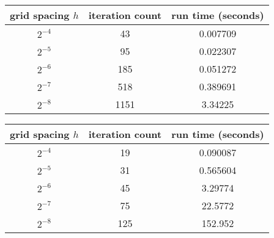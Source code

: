 \documentclass[12pt]{article}
\begin{document}
\begin{center}
\begin{tabular}{||c|c|c||}
\hline \hline
   grid spacing $h$ &   iteration count &   run time (seconds) \\
\hline
       $2^{-4}$     &                43 &             0.007709 \\
       $2^{-5}$    &                95 &             0.022307 \\
       $2^{-6}$   &               185 &             0.051272 \\
       $2^{-7}$  &               518 &             0.389691 \\
       $2^{-8}$ &              1151 &             3.34225  \\
\hline
\end{tabular}
\end{center}
\newpage
\begin{center}
\begin{tabular}{||c|c|c||}
\hline \hline
   grid spacing $h$ &   iteration count &   run time (seconds) \\
\hline \hline
       $2^{-4}$     &                19 &             0.090087 \\
       $2^{-5}$    &                31 &             0.565604 \\
       $2^{-6}$   &                45 &             3.29774  \\
       $2^{-7}$  &                75 &            22.5772   \\
       $2^{-8}$ &               125 &           152.952    \\
\hline
\end{tabular}
\end{center}
\end{document}
